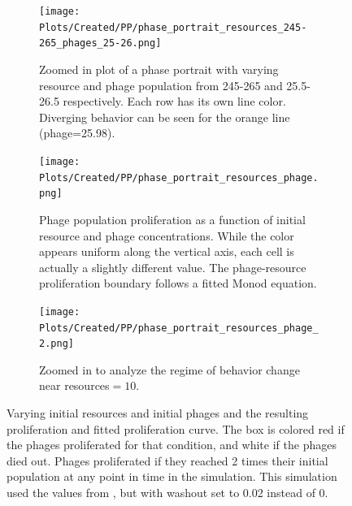 \begin{figure}[]
    \centering
    \begin{subfigure}{0.49\linewidth}
        \centering
        \texttt{[image: Plots/Created/PP/phase\_portrait\_resources\_245-265\_phages\_25-26.png]}
        \caption{
            Zoomed in plot of a phase portrait with varying resource and phage population from 245-265 and 25.5-26.5 respectively. 
            Each row has its own line color. 
            Diverging behavior can be seen for the orange line (phage=25.98). 
        }
        \label{fig:created:phase_portrait_resources_245-265_phages_25-26}
    \end{subfigure}
    \hfill
    \begin{subfigure}{0.49\linewidth}
        \centering
        \texttt{[image: Plots/Created/PP/phase\_portrait\_resources\_phage.png]}
        \caption{
            Phage population proliferation as a function of initial resource and phage concentrations. 
            While the color appears uniform along the vertical axis, each cell is actually a slightly different value. 
            The phage-resource proliferation boundary follows a fitted Monod equation.
        }
        \label{fig:created:phase_portrait_resources_phage}
    \end{subfigure}
    \hfill
    \begin{subfigure}{0.49\linewidth}
        \centering
        \texttt{[image: Plots/Created/PP/phase\_portrait\_resources\_phage\_2.png]}
        \caption{
            Zoomed in to analyze the regime of behavior change near resources$=10$. 
        }
        \label{fig:created:phase_portrait_resources_phage_2}
    \end{subfigure}
    \caption{
        Varying initial resources and initial phages and the resulting proliferation and fitted proliferation curve. 
        The box is colored red if the phages proliferated for that condition, and white if the phages died out. 
        Phages proliferated if they reached 2 times their initial population at any point in time in the simulation. 
        This simulation used the values from , but with washout set to 0.02 instead of 0. 
    }
    \label{fig:created:phase_portrait_resource_phage_proliferate}
\end{figure}

